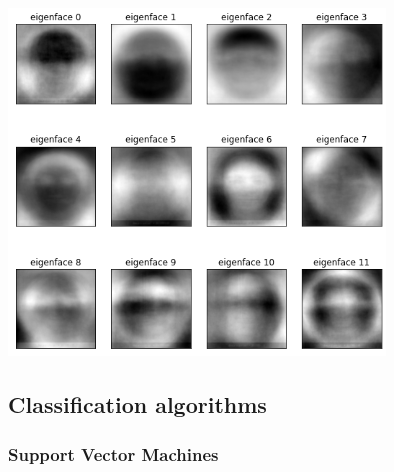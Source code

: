 \documentclass{article}
\begin{document}
\begin{center}
  \includegraphics[width=10cm]{eigenfaces.png}
\end{center}

\subsection{Classification algorithms}


\subsubsection{Support Vector Machines}
\end{document}
